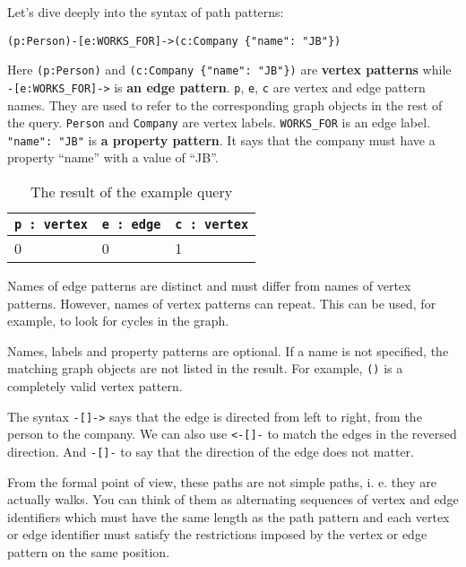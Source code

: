 \documentclass[14pt]{constructor-thesis}
\theoremstyle{definition}
\begin{document}
Let's dive deeply into the syntax of path patterns:
\begin{verbatim}
(p:Person)-[e:WORKS_FOR]->(c:Company {"name": "JB"})
\end{verbatim}

Here \verb+(p:Person)+ and \verb+(c:Company {"name": "JB"})+ are \textbf{vertex patterns} while \verb+-[e:WORKS_FOR]->+ is \textbf{an edge pattern}. \texttt{p}, \texttt{e}, \texttt{c} are vertex and edge pattern names. They are used to refer to the corresponding graph objects in the rest of the query. \texttt{Person} and \texttt{Company} are vertex labels. \texttt{WORKS\_FOR} is an edge label. \texttt{"name": "JB"} is \textbf{a property pattern}. It says that the company must have a property ``name'' with a value of ``JB''.

\begin{table}[b]
  \centering
  
  \begin{tabular}{ |p{3cm}|p{3cm}|p{3cm}|  }
    \hline
    \texttt{p : vertex} & \texttt{e : edge} & \texttt{c : vertex} \\
    \hline
    0 & 0 & 1 \\
    \hline
  \end{tabular}

  \caption{The result of the example query}
  \label{tab:example-query-binding-table}
\end{table}

Names of edge patterns are distinct and must differ from names of vertex patterns. However, names of vertex patterns can repeat. This can be used, for example, to look for cycles in the graph.

Names, labels and property patterns are optional. If a name is not specified, the matching graph objects are not listed in the result. For example, \texttt{()} is a completely valid vertex pattern.

The syntax \texttt{-[]->} says that the edge is directed from left to right, from the person to the company. We can also use \texttt{<-[]-} to match the edges in the reversed direction. And \texttt{-[]-} to say that the direction of the edge does not matter.

From the formal point of view, these paths are not simple paths, i. e. they are actually walks. You can think of them as alternating sequences of vertex and edge identifiers which must have the same length as the path pattern and each vertex or edge identifier must satisfy the restrictions imposed by the vertex or edge pattern on the same position.
\end{document}
